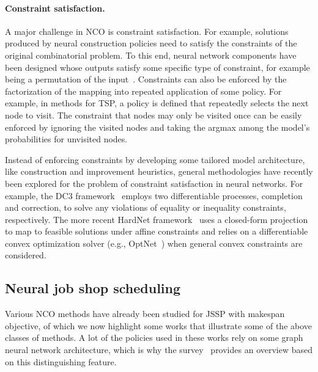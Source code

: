 \documentclass[a4paper]{report}
\theoremstyle{definition}
\theoremstyle{plain}
\begin{document}


\paragraph{Constraint satisfaction.}
A major challenge in NCO is constraint
satisfaction. For example, solutions produced by neural construction policies
need to satisfy the constraints of the original combinatorial problem.
To this
end, neural network components have been designed whose outputs satisfy some
specific type of constraint, for example being a permutation of the
input~\cite{vinyalsPointerNetworks2017a}. Constraints can also be enforced by
the factorization of the mapping into repeated application of some policy. For
example, in methods for TSP, a policy is defined that repeatedly selects the
next node to visit. The constraint that nodes may only be visited once can be
easily enforced by ignoring the visited nodes and taking the argmax among the
model's probabilities for unvisited nodes.


Instead of enforcing constraints by developing some tailored model architecture,
like construction and improvement heuristics, general methodologies have
recently been explored for the problem of constraint satisfaction in neural
networks. For example, the DC3 framework~\cite{dontiDC3LearningMethod2021}
employs two differentiable processes, completion and correction, to solve any
violations of equality or inequality constraints, respectively. The more recent
HardNet framework~\cite{minHardConstrainedNeuralNetworks2024} uses a closed-form
projection to map to feasible solutions under affine constraints and relies on a
differentiable convex optimization solver (e.g.,
OptNet~\cite{amosOptNetDifferentiableOptimization2021a}) when general convex
constraints are considered.

\subsection{Neural job shop scheduling}

Various NCO methods have already been studied for JSSP with makespan objective,
of which we now highlight some works that illustrate some of the above classes
of methods. A lot of the policies used in these works rely on some graph neural
network architecture, which is why the survey~\cite{smitGraphNeuralNetworks2024}
provides an overview based on this distinguishing feature.
\end{document}
